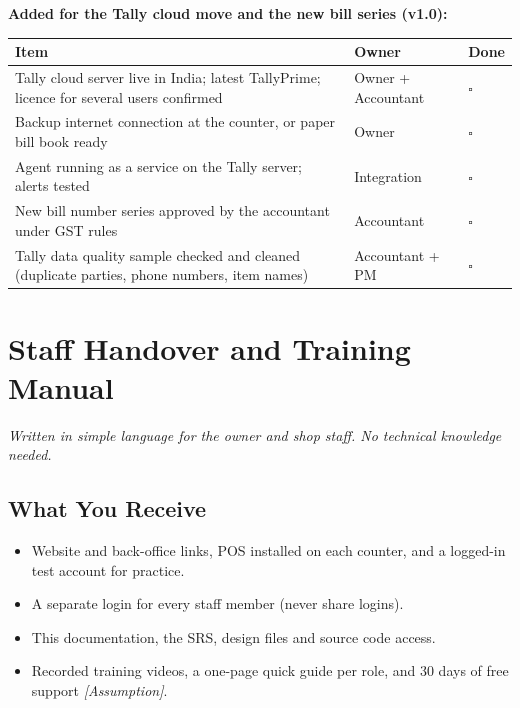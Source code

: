 \documentclass[11pt,a4paper]{article}
\newcommand{\assump}{\textit{[Assumption]}}
\newcommand{\chk}{$\square$}
\newcommand{\hdr}{\rowcolor{hdrgray}\bfseries}
\begin{document}
\textbf{Added for the Tally cloud move and the new bill series (v1.0):}
\begin{longtable}{L{10.5cm}L{4.4cm}L{1.6cm}}
\hdr Item & Owner & Done \\ \endhead
Tally cloud server live in India; latest TallyPrime; licence for several users confirmed & Owner + Accountant & \chk \\
Backup internet connection at the counter, or paper bill book ready & Owner & \chk \\
Agent running as a service on the Tally server; alerts tested & Integration & \chk \\
New bill number series approved by the accountant under GST rules & Accountant & \chk \\
Tally data quality sample checked and cleaned (duplicate parties, phone numbers, item names) & Accountant + PM & \chk \\
\end{longtable}

\section{Staff Handover and Training Manual}
\textit{Written in simple language for the owner and shop staff. No technical knowledge needed.}

\subsection{What You Receive}
\begin{itemize}
\item Website and back-office links, POS installed on each counter, and a logged-in test account for practice.
\item A separate login for every staff member (never share logins).
\item This documentation, the SRS, design files and source code access.
\item Recorded training videos, a one-page quick guide per role, and 30 days of free support \assump.
\end{itemize}
\end{document}

